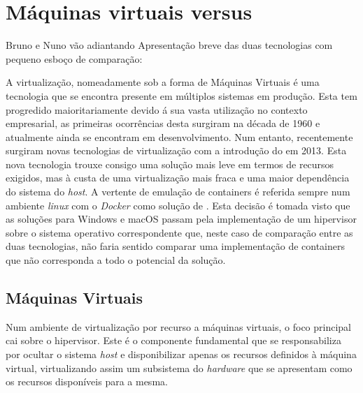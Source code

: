 
\section{Máquinas virtuais versus \conts}

{ \color{red} Bruno e Nuno vão adiantando }
{ \color{blue} Apresentação breve das duas tecnologias com pequeno esboço de comparação: }

A virtualização, nomeadamente sob a forma de Máquinas Virtuais é uma tecnologia que se encontra presente 
em múltiplos sistemas em produção. Esta tem progredido maioritariamente devido á sua vasta utilização no contexto empresarial, as primeiras ocorrências desta surgiram na década de 1960 e atualmente ainda se encontram em desenvolvimento. Num entanto, recentemente surgiram novas tecnologias de virtualização com a introdução do  \lincont em 2013. Esta nova tecnologia trouxe consigo uma solução mais leve em termos de recursos exigidos, mas à custa de uma virtualização mais fraca e uma maior dependência do sistema do \textit{host}. A vertente de emulação de containers é referida sempre num ambiente \textit{linux} com o \textit{Docker} como solução de \conts. Esta decisão é tomada visto que as soluções para Windows e macOS passam pela implementação de um hipervisor sobre o sistema operativo correspondente que, neste caso de comparação entre as duas tecnologias, não faria sentido comparar uma implementação de containers que não corresponda a todo o potencial da solução.


\subsection{Máquinas Virtuais}

Num ambiente de virtualização por recurso a máquinas virtuais, o foco principal cai sobre o hipervisor. Este é o componente fundamental que se responsabiliza por ocultar o sistema \textit{host} e disponibilizar apenas os recursos definidos à máquina virtual, virtualizando assim um subsistema do \textit{hardware} que se apresentam como os recursos disponíveis para a mesma.

